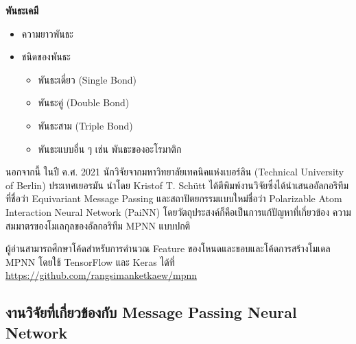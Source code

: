 \medskip

\noindent \textbf{พันธะเคมี}

\begin{itemize}[topsep=0pt]
    \item ความยาวพันธะ
    
    \item ชนิดของพันธะ
    \begin{itemize}[topsep=0pt]
        \item พันธะเดี่ยว (Single Bond)
        
        \item พันธะคู่ (Double Bond)
        
        \item พันธะสาม (Triple Bond)
        
        \item พันธะแบบอื่น ๆ เช่น พันธะของอะโรมาติก
    \end{itemize}
\end{itemize}

นอกจากนี้ ในปี ค.ศ. 2021 นักวิจัยจากมหาวิทยาลัยเทคนิคแห่งเบอร์ลิน (Technical University of Berlin) ประเทศเยอรมัน นำโดย 
Kristof T. Sch\"{u}tt ได้ตีพิมพ์งานวิจัยซึ่งได้นำเสนออัลกอริทึมที่ชื่อว่า Equivariant Message Passing และสถาปัตยกรรมแบบใหม่ชื่อว่า 
Polarizable Atom Interaction Neural Network (PaiNN)\autocite{schutt2021} โดยวัตถุประสงค์ก็คือเป็นการแก้ปัญหาที่เกี่ยวข้อง%
ความสมมาตรของโมเลกุลของอัลกอริทึม MPNN แบบปกติ

ผู้อ่านสามารถศึกษาโค้ดสำหรับการคำนวณ Feature ของโหนดและขอบและโค้ดการสร้างโมเดล MPNN โดยใช้ TensorFlow และ Keras ได้ที่
\url{https://github.com/rangsimanketkaew/mpnn}

\subsection{งานวิจัยที่เกี่ยวข้องกับ Message Passing Neural Network}
\label{ssec:mpnn_papers}

